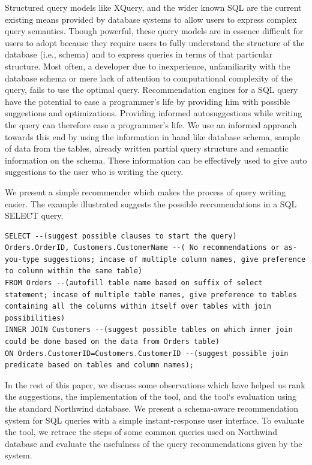 \documentclass{acm_proc_article-sp}
\begin{document}
Structured query models like XQuery, and the wider known SQL are the current existing means provided by database systems to allow users to express complex query semantics. Though powerful, these query models are in essence difficult for users to adopt because they require users to fully understand the structure of the database (i.e., schema) and to express queries in terms of that particular structure. Most often, a developer due to inexperience, unfamiliarity with the database schema or mere lack of attention to computational complexity of the query, fails to use the optimal query. Recommendation engines for a SQL query have the potential to ease a programmer's life by providing him with possible suggestions and optimizations. Providing informed autosuggestions while writing the query can therefore ease a programmer's life.  We use an informed approach towards this end by using the information in hand like database schema, sample of data from the tables, already written partial query structure and semantic information on the schema. These information can be effectively used to give auto suggestions to the user who is writing the query. 

We present a simple recommender which makes the process of query writing easier.  The example illustrated suggests the possible reccomendations in a SQL SELECT query. 

\lstset{language=SQL,breaklines=true}
\begin{lstlisting}[float=*]
SELECT --(suggest possible clauses to start the query)
Orders.OrderID, Customers.CustomerName --( No recommendations or as-you-type suggestions; incase of multiple column names, give preference to column within the same table) 
FROM Orders --(autofill table name based on suffix of select statement; incase of multiple table names, give preference to tables containing all the columns within itself over tables with join possibilities) 
INNER JOIN Customers --(suggest possible tables on which inner join could be done based on the data from Orders table) 
ON Orders.CustomerID=Customers.CustomerID --(suggest possible join predicate based on tables and column names); 
\end{lstlisting}

In the rest of this paper, we discuss some observations which have helped us rank the suggestions, the implementation of the tool, and the tool`s evaluation using the standard Northwind database. We present a schema-aware recommendation system for SQL queries with a simple instant-response user interface. To evaluate the tool, we retrace the steps of some common queries used on Northwind database and evaluate the usefulness of the query recommendations given by the system.  
\end{document}

